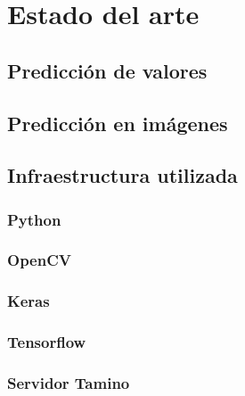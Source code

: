\chapter{Estado del arte}\label{cap.estado}

\section{Predicción de valores}

\section{Predicción en imágenes}

\section{Infraestructura utilizada}
\subsection{Python}
\subsection{OpenCV}
\subsection{Keras}
\subsection{Tensorflow}
\subsection{Servidor Tamino}